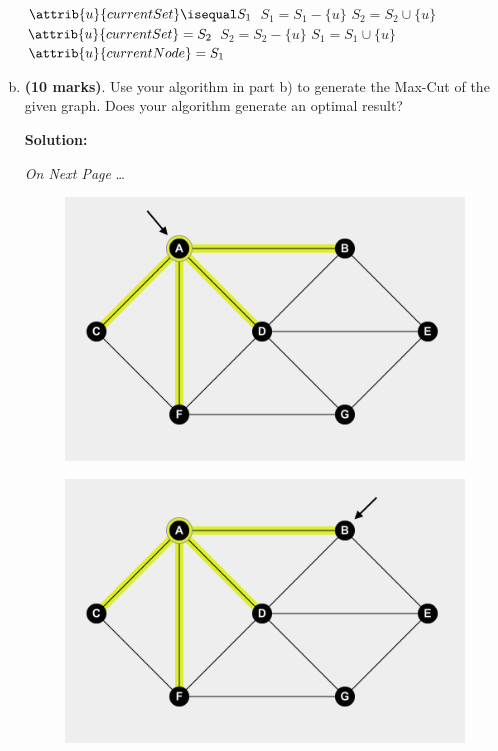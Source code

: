 \begin{homeworkProblem}
\begin{enumerate}[a)]
    \begin{codebox}
    \li \If $\attrib{u}{currentSet} \isequal S_1$
    \li 	\Do 
    			$S_1 = S_1 - \{u\}$
    \li         $S_2 = S_2 \cup \{u\}$
    \li 		$\attrib{u}{currentSet} = S_2$
    		\End 
    \li \Else
    \li		\Do 
            	$S_2 = S_2 - \{u\}$
    \li         $S_1 = S_1 \cup \{u\}$
    \li 		$\attrib{u}{currentNode} = S_1$
    		\End 
	\end{codebox}

	\clearpage

    \item \textbf{(10 marks)}. Use your algorithm in part b) to generate the 
    Max-Cut of the given graph. Does your algorithm generate an optimal result? 
    \par
    \textbf{Solution:}
    \par 
	\vspace*{7cm}
    
    \begin{center}
    \textit{On Next Page} \ldots
	\end{center}

    \clearpage
        
  \vspace*{2cm}
  
    \begin{figure}[ht]
\centering
\begin{minipage}{.5\textwidth}
  \centering
  \includegraphics[width=.4\linewidth]{q3-a2}
  \label{fig:test3}
\end{minipage}%
\begin{minipage}{.5\textwidth}
  \centering
  \includegraphics[width=.4\linewidth]{q3-b1}
  \label{fig:test4}
\end{minipage}
\end{figure}


\end{enumerate}
\end{homeworkProblem}
